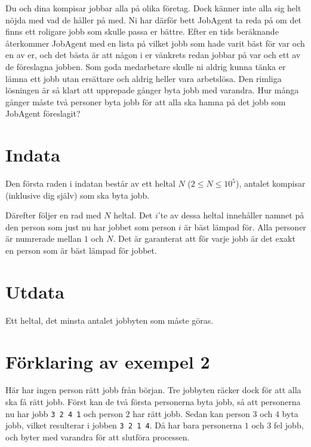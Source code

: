 Du och dina kompisar jobbar alla på olika företag. 
Dock känner inte alla sig helt nöjda med vad de håller på med. 
Ni har därför bett JobAgent ta reda på om det finns ett roligare jobb som skulle passa er bättre.
Efter en tids beräknande återkommer JobAgent med en lista på vilket jobb som hade varit bäst för var och en av er, och det bästa är att någon i er vänkrets redan jobbar på var och ett av de föreslagna jobben. 
Som goda medarbetare skulle ni aldrig kunna tänka er lämna ett jobb utan ersättare och aldrig heller vara arbetslösa.
Den rimliga lösningen är så klart att upprepade gånger byta jobb med varandra.
Hur många gånger måste två personer byta jobb för att alla ska hamna på det jobb som JobAgent föreslagit?

\section*{Indata}
Den första raden i indatan består av ett heltal $N$ ($2 \le N \le 10^5$), antalet kompisar (inklusive dig själv) som ska byta jobb.

Därefter följer en rad med $N$ heltal.
Det $i$'te av dessa heltal innehåller namnet på den person som just nu har jobbet som person $i$ är bäst lämpad för.
Alla personer är numrerade mellan $1$ och $N$.
Det är garanterat att för varje jobb är det exakt en person som är bäst lämpad för jobbet.

\section*{Utdata}
Ett heltal, det minsta antalet jobbyten som måste göras. 

\section*{Förklaring av exempel 2}
Här har ingen person rätt jobb från början.
Tre jobbyten räcker dock för att alla ska få rätt jobb.
Först kan de två första personerna byta jobb, så att personerna nu har jobb \texttt{3 2 4 1} och person $2$ har rätt jobb.
Sedan kan person $3$ och $4$ byta jobb, vilket resulterar i jobben \texttt{3 2 1 4}.
Då har bara personerna $1$ och $3$ fel jobb, och byter med varandra för att slutföra processen.
